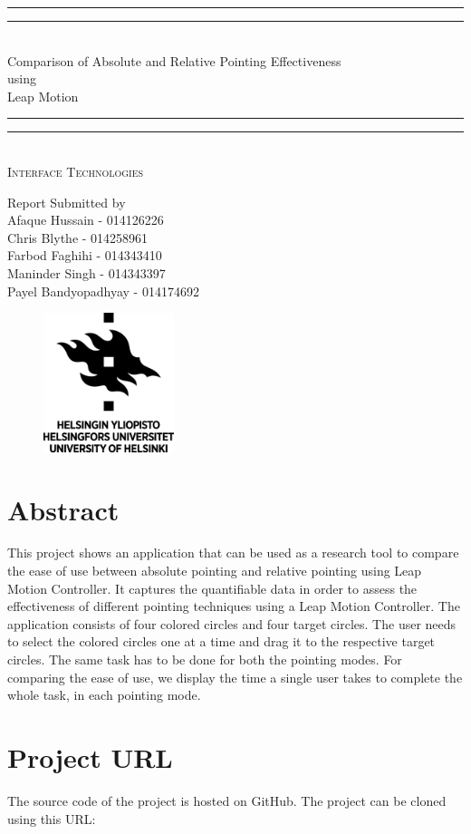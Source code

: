 \documentclass[titlepage]{article}
\newcommand*{\plogo}{\fbox{$\mathcal{UH}$}} %
\newcommand*{\titleGP}{\begingroup %
\centering %
\vspace*{\baselineskip} %

\rule{\textwidth}{1.6pt}\vspace*{-\baselineskip}\vspace*{2pt} %
\rule{\textwidth}{0.4pt}\\[\baselineskip] %

{\LARGE Comparison of Absolute and Relative Pointing Effectiveness \\ using \\[0.3\baselineskip] Leap Motion}\\[0.2\baselineskip] %

\rule{\textwidth}{0.4pt}\vspace*{-\baselineskip}\vspace{3.2pt} %
\rule{\textwidth}{1.6pt}\\[\baselineskip] %

\scshape %
Interface Technologies \\ %

\vspace*{2\baselineskip} %

Report Submitted by \\[\baselineskip]
{\Large Afaque Hussain - 014126226 \\ Chris Blythe - 014258961 \\ Farbod Faghihi - 014343410  \\   Maninder Singh - 014343397\\ Payel Bandyopadhyay - 014174692 \\} %

\vfill %

\begin{figure}[!h]
\centering
\includegraphics[width=1.5in]{Logo_UH}
\end{figure}

\endgroup}
\begin{document}
\titleGP
\clearpage


 

\tableofcontents
\newpage
{}
\setcounter{page}{1}
\section{Abstract}
This project shows an application that can be used as a research tool to compare the ease of use between absolute pointing and relative pointing using Leap Motion Controller. It captures the quantifiable data in order to assess the effectiveness of different pointing techniques using a Leap Motion Controller. The application consists of four colored circles and four target circles. The user needs to select the colored circles one at a time and drag it to the respective target circles. The same task has to be done for both the pointing modes. For comparing the ease of use, we display the time a single user takes to complete the whole task, in each pointing mode. \\
\newpage
\section{Project URL}
The source code of the project is hosted on GitHub. The project can be cloned using this URL: 
\end{document}
